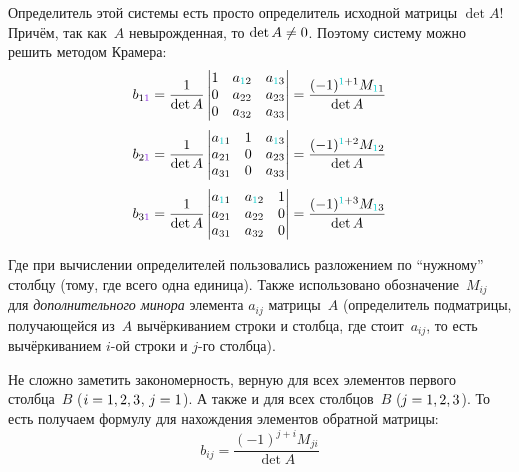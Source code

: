 \documentclass[a4paper,12pt]{article}
\theoremstyle{remark}
\begin{document}
  Определитель этой системы есть просто определитель исходной матрицы $\det A$!
  Причём, так как~$A$ невырожденная, то $\det A \hm{\not=} 0$.
  Поэтому систему можно решить методом Крамера:
  \[
    b_{1\textcolor{light-purple}{1}} = \frac{1}{\det A} \begin{vmatrix}
      1                         & a_{\textcolor{light-cyan}{1}2} & a_{\textcolor{light-cyan}{1}3}\\
      0                         & a_{22}                         & a_{23}\\
      0                         & a_{32}                         & a_{33}
    \end{vmatrix} = \frac{(-1)^{\textcolor{light-cyan}{1}+1} M_{\textcolor{light-cyan}{1}1}}{\det A}
  \]
  \[
    b_{2\textcolor{light-purple}{1}} = \frac{1}{\det A} \begin{vmatrix}
      a_{\textcolor{light-cyan}{1}1} & 1                         & a_{\textcolor{light-cyan}{1}3}\\
      a_{21}                         & 0                         & a_{23}\\
      a_{31}                         & 0                         & a_{33}
    \end{vmatrix} = \frac{(-1)^{\textcolor{light-cyan}{1}+2} M_{\textcolor{light-cyan}{1}2}}{\det A}
  \]
  \[
    b_{3\textcolor{light-purple}{1}} = \frac{1}{\det A} \begin{vmatrix}
      a_{\textcolor{light-cyan}{1}1} & a_{\textcolor{light-cyan}{1}2} & 1\\
      a_{21}                         & a_{22}                         & 0\\
      a_{31}                         & a_{32}                         & 0
    \end{vmatrix} = \frac{(-1)^{\textcolor{light-cyan}{1}+3} M_{\textcolor{light-cyan}{1}3}}{\det A}
  \]
  
  Где при вычислении определителей пользовались разложением по ``нужному'' столбцу (тому, где всего одна единица).
  Также использовано обозначение~$M_{ij}$ для \emph{дополнительного минора} элемента $a_{ij}$ матрицы~$A$ (определитель подматрицы, получающейся из~$A$ вычёркиванием строки и столбца, где стоит~$a_{ij}$, то есть вычёркиванием $i$-ой строки и $j$-го столбца).\
  
  Не сложно заметить закономерность, верную для всех элементов первого столбца~$B$ ($i \hm= 1, 2, 3$, $j \hm= 1$).
  А также и для всех столбцов~$B$ ($j \hm= 1, 2, 3$).
  То есть получаем формулу для нахождения элементов обратной матрицы:
  \begin{equation}\label{eq:inverse-matrix}
    \boxed{
      b_{ij} = \frac{(-1)^{j + i} M_{ji}}{\det A}
    }
  \end{equation}
  
\end{document}
